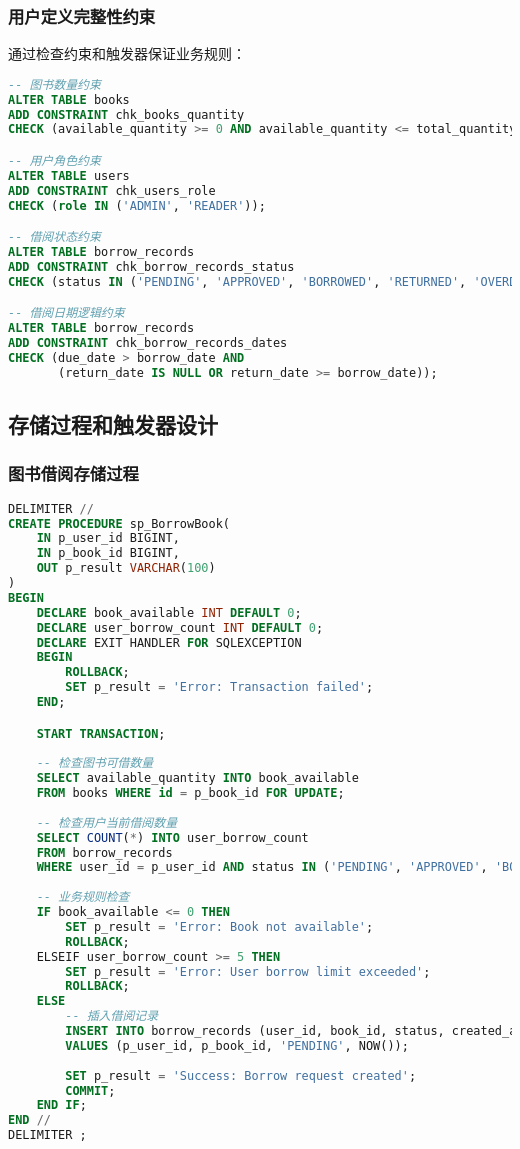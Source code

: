 \documentclass[12pt,a4paper]{article}
\begin{document}
\subsubsection{用户定义完整性约束}
通过检查约束和触发器保证业务规则：
\begin{lstlisting}[language=sql]
-- 图书数量约束
ALTER TABLE books 
ADD CONSTRAINT chk_books_quantity 
CHECK (available_quantity >= 0 AND available_quantity <= total_quantity);

-- 用户角色约束
ALTER TABLE users 
ADD CONSTRAINT chk_users_role 
CHECK (role IN ('ADMIN', 'READER'));

-- 借阅状态约束
ALTER TABLE borrow_records 
ADD CONSTRAINT chk_borrow_records_status 
CHECK (status IN ('PENDING', 'APPROVED', 'BORROWED', 'RETURNED', 'OVERDUE', 'REJECTED'));

-- 借阅日期逻辑约束
ALTER TABLE borrow_records 
ADD CONSTRAINT chk_borrow_records_dates 
CHECK (due_date > borrow_date AND 
       (return_date IS NULL OR return_date >= borrow_date));
\end{lstlisting}

\subsection{存储过程和触发器设计}

\subsubsection{图书借阅存储过程}
\begin{lstlisting}[language=sql]
DELIMITER //
CREATE PROCEDURE sp_BorrowBook(
    IN p_user_id BIGINT,
    IN p_book_id BIGINT,
    OUT p_result VARCHAR(100)
)
BEGIN
    DECLARE book_available INT DEFAULT 0;
    DECLARE user_borrow_count INT DEFAULT 0;
    DECLARE EXIT HANDLER FOR SQLEXCEPTION
    BEGIN
        ROLLBACK;
        SET p_result = 'Error: Transaction failed';
    END;

    START TRANSACTION;
    
    -- 检查图书可借数量
    SELECT available_quantity INTO book_available 
    FROM books WHERE id = p_book_id FOR UPDATE;
    
    -- 检查用户当前借阅数量
    SELECT COUNT(*) INTO user_borrow_count 
    FROM borrow_records 
    WHERE user_id = p_user_id AND status IN ('PENDING', 'APPROVED', 'BORROWED');
    
    -- 业务规则检查
    IF book_available <= 0 THEN
        SET p_result = 'Error: Book not available';
        ROLLBACK;
    ELSEIF user_borrow_count >= 5 THEN
        SET p_result = 'Error: User borrow limit exceeded';
        ROLLBACK;
    ELSE
        -- 插入借阅记录
        INSERT INTO borrow_records (user_id, book_id, status, created_at)
        VALUES (p_user_id, p_book_id, 'PENDING', NOW());
        
        SET p_result = 'Success: Borrow request created';
        COMMIT;
    END IF;
END //
DELIMITER ;
\end{lstlisting}
\end{document}
